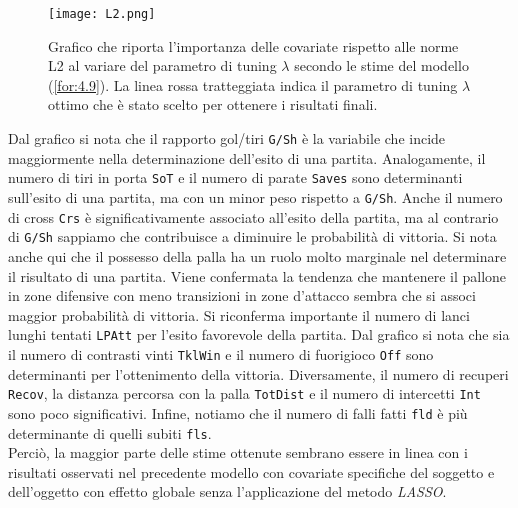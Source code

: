 \begin{figure}[htbp]
	\begin{center}
		\texttt{[image: L2.png]}
		\caption{Grafico che riporta l'importanza delle covariate rispetto alle norme L2 al variare del parametro di tuning $\lambda$ secondo le stime del modello (\ref{for:4.9}). La linea rossa tratteggiata indica il parametro di tuning $\lambda$ ottimo che è stato scelto per ottenere i risultati finali.} \label{fig:l2BTCL}
	\end{center}
\end{figure}
Dal grafico si nota che il rapporto gol/tiri \texttt{G/Sh} è la variabile che incide maggiormente nella determinazione dell'esito di una partita. Analogamente, il numero di tiri in porta \texttt{SoT} e il numero di parate \texttt{Saves} sono determinanti sull'esito di una partita, ma con un minor peso rispetto a \texttt{G/Sh}. Anche il numero di cross \texttt{Crs} è significativamente associato all'esito della partita, ma al contrario di \texttt{G/Sh} sappiamo che contribuisce a diminuire le probabilità di vittoria. Si nota anche qui che il possesso della palla ha un ruolo molto marginale nel determinare il risultato di una partita. Viene confermata la tendenza che mantenere il pallone in zone difensive con meno transizioni in zone d'attacco sembra che si associ maggior probabilità di vittoria. Si riconferma importante il numero di lanci lunghi tentati \texttt{LPAtt} per l'esito favorevole della partita. Dal grafico si nota che sia il numero di contrasti vinti \texttt{TklWin} e il numero di fuorigioco \texttt{Off} sono determinanti per l'ottenimento della vittoria. Diversamente, il numero di recuperi \texttt{Recov}, la distanza percorsa con la palla \texttt{TotDist} e il numero di intercetti \texttt{Int} sono poco significativi. Infine, notiamo che il numero di falli fatti \texttt{fld} è più determinante di quelli subiti \texttt{fls}.\\
Perciò, la maggior parte delle stime ottenute sembrano essere in linea con i risultati osservati nel precedente modello con covariate specifiche del soggetto e dell'oggetto con effetto globale senza l'applicazione del metodo \emph{LASSO}.

